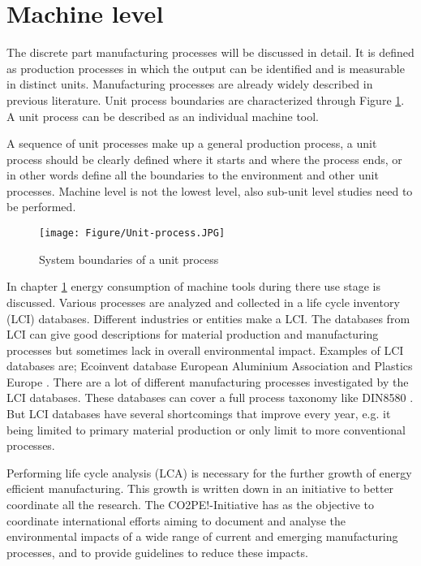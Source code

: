 \newpage
\section{Machine level}
\label{chapter2}
\textit{}

The discrete part manufacturing processes will be discussed in detail. It is defined as production processes in which the output can be identified and is measurable in distinct units\cite{Duflou2012}. Manufacturing processes are already widely described in previous literature. Unit process boundaries are characterized through Figure \ref{fig:BoundariesProcess}. A unit process can be described as an individual machine tool.



A sequence of unit processes make up a general production process, a unit process should be clearly defined where it starts and where the process ends, or in other words define all the boundaries to the environment and other unit processes. Machine level is not the lowest level, also sub-unit level studies need to be performed\cite{Kellens2012}.

\begin{figure}[h!]
	\centering
	\texttt{[image: Figure/Unit-process.JPG]}
	\caption{System boundaries of a unit process \cite{Kellens2012}}
	\label{fig:BoundariesProcess}
\end{figure}

In chapter \ref{chapter2} energy consumption of machine tools during there use stage is discussed. Various processes are analyzed and collected in a life cycle inventory (LCI) databases. Different industries or entities make a LCI. The databases from LCI can give good descriptions for material production and manufacturing processes but sometimes lack in overall environmental impact\cite{Duflou2012}. Examples of LCI databases are; Ecoinvent database \cite{Frischknecht2007} European Aluminium Association \cite{EuropeanAluminiumAssociation2018} and Plastics Europe \cite{EcoProfiles}. There are a lot of different manufacturing processes investigated by the LCI databases. These databases can cover a full process taxonomy like DIN8580 \cite{DIN2003}. But LCI databases have several shortcomings that improve every year, e.g. it being limited to primary material production or only limit to more conventional processes. 


Performing life cycle analysis (LCA) is necessary for the further growth of energy efficient manufacturing. This growth is written down in an initiative to better coordinate all the research. The CO2PE!-Initiative \cite{Kellens2012} has as the objective to coordinate international efforts aiming to document and analyse the environmental impacts of a wide range of current and emerging manufacturing processes, and to provide guidelines to reduce these impacts.

